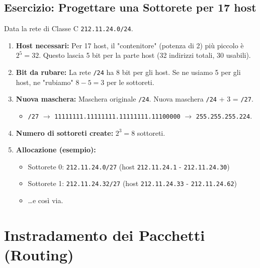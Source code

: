 \subsection{Esercizio: Progettare una Sottorete per 17 host}
Data la rete di Classe C \texttt{212.11.24.0/24}.
\begin{enumerate}
    \item \textbf{Host necessari:} Per 17 host, il "contenitore" (potenza di 2) più piccolo è $2^5 = 32$. Questo lascia 5 bit per la parte host (32 indirizzi totali, 30 usabili).
    \item \textbf{Bit da rubare:} La rete \texttt{/24} ha 8 bit per gli host. Se ne usiamo 5 per gli host, ne "rubiamo" $8 - 5 = 3$ per le sottoreti.
    \item \textbf{Nuova maschera:} Maschera originale \texttt{/24}. Nuova maschera \texttt{/24} + 3 = \texttt{/27}.
    \begin{itemize}
        \item \texttt{/27} $\rightarrow$ \texttt{11111111.11111111.11111111.11100000} $\rightarrow$ \texttt{255.255.255.224}.
    \end{itemize}
    \item \textbf{Numero di sottoreti create:} $2^3 = 8$ sottoreti.
    \item \textbf{Allocazione (esempio):}
    \begin{itemize}
        \item Sottorete 0: \texttt{212.11.24.0/27} (host \texttt{212.11.24.1} - \texttt{212.11.24.30})
        \item Sottorete 1: \texttt{212.11.24.32/27} (host \texttt{212.11.24.33} - \texttt{212.11.24.62})
        \item \dots e così via.
    \end{itemize}
\end{enumerate}

\section{Instradamento dei Pacchetti (Routing)}

